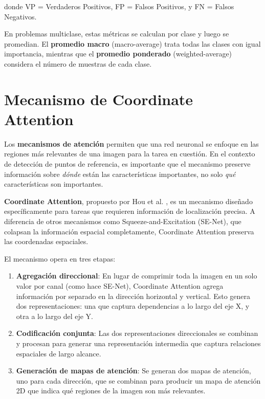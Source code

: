 donde VP = Verdaderos Positivos, FP = Falsos Positivos, y FN = Falsos Negativos.

En problemas multiclase, estas métricas se calculan por clase y luego se promedian. El \textbf{promedio macro} (macro-average) trata todas las clases con igual importancia, mientras que el \textbf{promedio ponderado} (weighted-average) considera el número de muestras de cada clase.

\section{Mecanismo de Coordinate Attention}
\label{sec:coord_attention}

Los \textbf{mecanismos de atención} permiten que una red neuronal se enfoque en las regiones más relevantes de una imagen para la tarea en cuestión. En el contexto de detección de puntos de referencia, es importante que el mecanismo preserve información sobre \textit{dónde} están las características importantes, no solo \textit{qué} características son importantes.

\textbf{Coordinate Attention}, propuesto por Hou et al. \cite{hou2021coordinate}, es un mecanismo diseñado específicamente para tareas que requieren información de localización precisa. A diferencia de otros mecanismos como Squeeze-and-Excitation (SE-Net), que colapsan la información espacial completamente, Coordinate Attention preserva las coordenadas espaciales.

El mecanismo opera en tres etapas:

\begin{enumerate}
    \item \textbf{Agregación direccional}: En lugar de comprimir toda la imagen en un solo valor por canal (como hace SE-Net), Coordinate Attention agrega información por separado en la dirección horizontal y vertical. Esto genera dos representaciones: una que captura dependencias a lo largo del eje X, y otra a lo largo del eje Y.

    \item \textbf{Codificación conjunta}: Las dos representaciones direccionales se combinan y procesan para generar una representación intermedia que captura relaciones espaciales de largo alcance.

    \item \textbf{Generación de mapas de atención}: Se generan dos mapas de atención, uno para cada dirección, que se combinan para producir un mapa de atención 2D que indica qué regiones de la imagen son más relevantes.
\end{enumerate}

